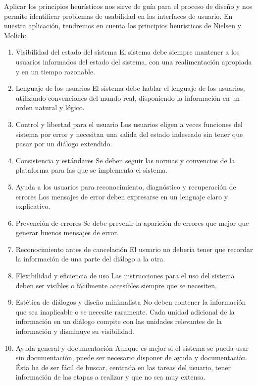 Aplicar los principios heurísticos nos sirve de guía para el proceso de diseño y nos permite identificar problemas de usabilidad en las interfaces de usuario. En nuestra aplicación, tendremos en cuenta los principios heurísticos de Nielsen y Molich:


\begin{enumerate}
\item Visibilidad del estado del sistema
El sistema debe siempre mantener a los usuarios informados del estado del sistema, con una realimentación apropiada y en un tiempo razonable.
\item Lenguaje de los usuarios
El sistema debe hablar el lenguaje de los usuarios, utilizando convenciones del mundo real, disponiendo la información en un orden natural y lógico.
\item Control y libertad para el usuario
Los usuarios eligen a veces funciones del sistema por error y necesitan una salida del estado indeseado sin tener que pasar por un diálogo extendido.
\item Consistencia y estándares
Se deben seguir las normas y convencios de la plataforma para las que se implementa el sistema.
\item Ayuda a los usuarios para reconocimiento, diagnóstico y recuperación de errores
Los mensajes de error deben expresarse en un lenguaje claro y explicativo.
\item Prevención de errores
Se debe prevenir la aparición de errores que mejor que generar buenos mensajes de error.
\item Reconocimiento antes de cancelación
El usuario no debería tener que recordar la información de una parte del diálogo a la otra.
\item Flexibilidad y eficiencia de uso
Las instrucciones para el uso del sistema deben ser visibles o fácilmente accesibles siempre que se necesiten.
\item Estética de diálogos y diseño minimalista
No deben contener la información que sea inaplicable o se necesite raramente. Cada unidad adicional de la información en un diálogo compite con las unidades relevantes de la información y disminuye su visibilidad.
\item Ayuda general y documentación
Aunque es mejor si el sistema se pueda usar sin documentación, puede ser necesario disponer de ayuda y documentación. Ésta ha de ser fácil de buscar, centrada en las tareas del usuario, tener información de las etapas a realizar y que no sea muy extensa. \cite{eval_heuris}
\end{enumerate}


